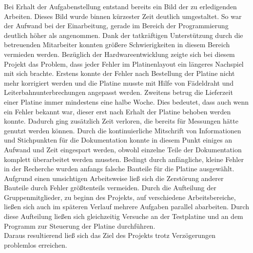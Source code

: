 Bei Erhalt der Aufgabenstellung entstand bereits ein Bild der zu erledigenden Arbeiten. Dieses Bild wurde binnen kürzester Zeit deutlich umgestaltet. So war der Aufwand bei der Einarbeitung, gerade im Bereich der Programmierung deutlich höher als angenommen. Dank der tatkräftigen Unterstützung durch die betreuenden Mitarbeiter konnten größere Schwierigkeiten in diesem Bereich vermieden werden. Bezüglich der Hardwareentwicklung zeigte sich bei diesem Projekt das Problem, dass jeder Fehler im Platinenlayout ein längeres Nachspiel mit sich brachte. Erstens konnte der Fehler nach Bestellung der Platine nicht mehr korrigiert werden und die Platine musste mit Hilfe von Fädeldraht und Leiterbahnunterbrechungen angepasst werden. Zweitens betrug die Lieferzeit einer Platine immer mindestens eine halbe Woche. Dies bedeutet, dass auch wenn ein Fehler bekannt war, dieser erst nach Erhalt der Platine behoben werden konnte. Dadurch ging zusätzlich Zeit verloren, die bereits für Messungen hätte genutzt werden können. Durch die kontinuierliche Mitschrift von Informationen und Stichpunkten für die Dokumentation konnte in diesem Punkt einiges an Aufwand und Zeit eingespart werden, obwohl einzelne Teile der Dokumentation komplett überarbeitet werden mussten. Bedingt durch anfängliche, kleine Fehler in der Recherche wurden anfangs falsche Bauteile für die Platine ausgewählt. Aufgrund einen umsichtigen Arbeitsweise ließ sich die Zerstörung anderer Bauteile durch Fehler größtenteils vermeiden. Durch die Aufteilung der Gruppenmitglieder, zu beginn des Projekts, auf verschiedene Arbeitsbereiche, ließen sich auch im späteren Verlauf mehrere Aufgaben parallel abarbeiten. Durch diese Aufteilung ließen sich gleichzeitig Versuche an der Testplatine und an dem Programm zur Steuerung der Platine durchführen.\\
Daraus resultierend ließ sich das Ziel des Projekts trotz Verzögerungen problemlos erreichen.
